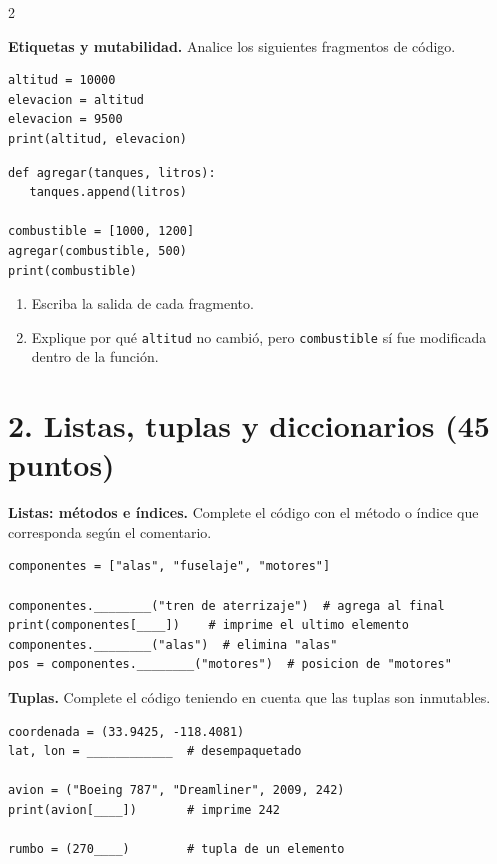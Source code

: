 \documentclass[addpoints,10pt]{exam}
\begin{document}
\begin{multicols}{2}
\begin{questions}
			\question[10]
			\textbf{Etiquetas y mutabilidad.} Analice los siguientes fragmentos de código.
			
\begin{lstlisting}
altitud = 10000
elevacion = altitud
elevacion = 9500
print(altitud, elevacion)
\end{lstlisting}

\begin{lstlisting}
def agregar(tanques, litros):
   tanques.append(litros)

combustible = [1000, 1200]
agregar(combustible, 500)
print(combustible)
\end{lstlisting}
			
			\begin{enumerate}
				\item Escriba la salida de cada fragmento.
				\item Explique por qué \texttt{altitud} no cambió, pero \texttt{combustible} sí fue modificada dentro de la función.
			\end{enumerate}
			
			\makeemptybox{4cm}
			
			\section*{2. Listas, tuplas y diccionarios (45 puntos)}
			
			\question[10]
			\textbf{Listas: métodos e índices.} Complete el código con el método o índice que corresponda según el comentario.
			
\begin{lstlisting}
componentes = ["alas", "fuselaje", "motores"]

componentes.________("tren de aterrizaje")  # agrega al final
print(componentes[____])    # imprime el ultimo elemento
componentes.________("alas")  # elimina "alas"
pos = componentes.________("motores")  # posicion de "motores"
\end{lstlisting}
			
			\question[10]
			\textbf{Tuplas.} Complete el código teniendo en cuenta que las tuplas son inmutables.
			
\begin{lstlisting}
coordenada = (33.9425, -118.4081)
lat, lon = ____________  # desempaquetado

avion = ("Boeing 787", "Dreamliner", 2009, 242)
print(avion[____])       # imprime 242

rumbo = (270____)        # tupla de un elemento
\end{lstlisting}
			

\end{questions}
\end{multicols}
\end{document}
